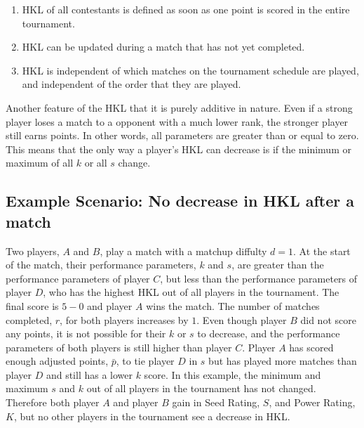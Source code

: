 \documentclass[letterpaper, 10 pt, conference]{ieeeconf}  %
\begin{document}
\begin{enumerate}
        \item HKL of all contestants is defined as soon as one point is scored in the entire tournament.
        \item HKL can be updated during a match that has not yet completed.
        \item HKL is independent of which matches on the tournament schedule are played, and independent of the order that they are played.
\end{enumerate}

Another feature of the HKL that it is purely additive in nature.
Even if a strong player loses a match to a opponent with a much lower rank, the stronger player still earns points. 
In other words, all parameters are greater than or equal to zero.
This means that the only way a player's HKL can decrease is if the minimum or maximum of all $k$ or all $s$ change. 

\subsection{Example Scenario: No decrease in HKL after a match}
Two players, $A$ and $B$, play a match with a matchup diffulty $d=1$.
At the start of the match, their performance parameters, $k$ and $s$, are greater than the performance parameters of player $C$, but less than the performance parameters of player $D$, who has the highest HKL out of all players in the tournament.
The final score is $5-0$ and player $A$ wins the match.
The number of matches completed, $r$, for both players increases by $1$.
Even though player $B$ did not score any points, it is not possible for their $k$ or $s$ to decrease, and the performance parameters of both players is still higher than player $C$.
Player $A$ has scored enough adjusted points, $\bar{p}$, to tie player $D$ in $s$ but has played more matches than player $D$ and still has a lower $k$ score.
In this example, the minimum and maximum $s$ and $k$ out of all players in the tournament has not changed. 
Therefore both player $A$ and player $B$ gain in Seed Rating, $S$, and Power Rating, $K$, but no other players in the tournament see a decrease in HKL.


\end{document}
